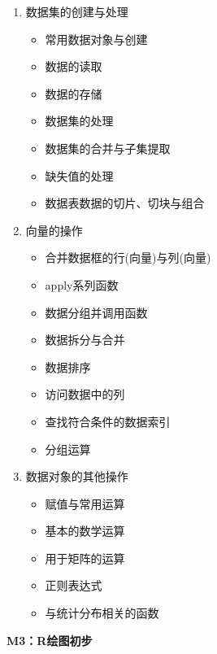 \documentclass[12pt,hyperref,]{ctexart}
\begin{document}
\begin{enumerate}
\def\labelenumi{\arabic{enumi}.}
\item
  数据集的创建与处理

  \begin{itemize}
  \item
    常用数据对象与创建
  \item
    数据的读取
  \item
    数据的存储
  \item
    数据集的处理
  \item
    数据集的合并与子集提取
  \item
    缺失值的处理
  \item
    数据表数据的切片、切块与组合
  \end{itemize}
\item
  向量的操作

  \begin{itemize}
  \item
    合并数据框的行(向量)与列(向量)
  \item
    apply系列函数
  \item
    数据分组并调用函数
  \item
    数据拆分与合并
  \item
    数据排序
  \item
    访问数据中的列
  \item
    查找符合条件的数据索引
  \item
    分组运算
  \end{itemize}
\item
  数据对象的其他操作

  \begin{itemize}
  \item
    赋值与常用运算
  \item
    基本的数学运算
  \item
    用于矩阵的运算
  \item
    正则表达式
  \item
    与统计分布相关的函数
  \end{itemize}
\end{enumerate}

\textbf{M3：R绘图初步}
\end{document}
